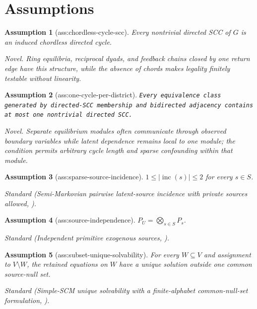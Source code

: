 \documentclass{article}
\newtheorem{assumption}{Assumption}
\begin{document}
\section{Assumptions}

\begin{assumption}[ass:chordless-cycle-scc]\label{ass:chordless-cycle-scc}
Every nontrivial directed SCC of \(G\) is an induced chordless directed cycle.
\par\smallskip\noindent\emph{Novel.} Ring equilibria, reciprocal dyads, and feedback chains closed by one return edge have this structure, while the absence of chords makes legality finitely testable without linearity.
\end{assumption}

\begin{assumption}[ass:one-cycle-per-district]\label{ass:one-cycle-per-district}
\texttt{Every equivalence class generated by directed-\allowbreak{}SCC membership and bidirected adjacency contains at most one nontrivial directed SCC.}
\par\smallskip\noindent\emph{Novel.} Separate equilibrium modules often communicate through observed boundary variables while latent dependence remains local to one module; the condition permits arbitrary cycle length and sparse confounding within that module.
\end{assumption}

\begin{assumption}[ass:sparse-source-incidence]\label{ass:sparse-source-incidence}
\(1\le |\operatorname{inc}(s)|\le2\) for every \(s\in S\).
\par\smallskip\noindent\emph{Standard} (Semi-Markovian pairwise latent-source incidence with private sources allowed, \cite{BongersForrePetersMooij2021}).
\end{assumption}

\begin{assumption}[ass:source-independence]\label{ass:source-independence}
\(P_U=\bigotimes_{s\in S}P_s\).
\par\smallskip\noindent\emph{Standard} (Independent primitive exogenous sources, \cite{BongersForrePetersMooij2021}).
\end{assumption}

\begin{assumption}[ass:subset-unique-solvability]\label{ass:subset-unique-solvability}
For every \(W\subseteq V\) and assignment to \(V\setminus W\), the retained equations on \(W\) have a unique solution outside one common source-null set.
\par\smallskip\noindent\emph{Standard} (Simple-SCM unique solvability with a finite-alphabet common-null-set formulation, \cite{BongersForrePetersMooij2021}).
\end{assumption}
\end{document}
